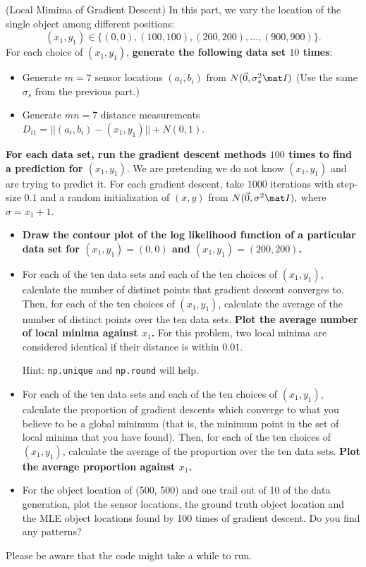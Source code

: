 \documentclass[preview]{standalone}
\begin{document}
\begin{Parts}
\Part (Local Mimima of Gradient Descent) In this part, we vary the
location of the single object among different positions: $$(x_1, y_1) \in \{(0,0),(100,100),(200,200),\dots,(900,900)\}.$$ For each choice of $(x_1,y_1)$, \textbf{generate the following data set $10$ times}:
  \begin{itemize}
    \item Generate $m=7$ sensor locations $(a_i, b_i)$ from $N(\vec 0,
      \sigma_s^2 \mat I)$ (Use the same $\sigma_s$ from the previous part.)
    \item Generate $mn=7$ distance measurements $D_{i1} = ||(a_i,b_i)-(x_1,y_1)|| + N(0, 1)$.
  \end{itemize}
 \textbf{For each data set, run the gradient descent methods $100$ times to find a prediction for $(x_1, y_1)$}. We are pretending we do not know $(x_1, y_1)$ and are trying to predict it. For each gradient descent, take $1000$ iterations with step-size $0.1$ and a random initialization of $(x,y)$ from $N(\vec 0, \sigma^2 \mat I),$ where $\sigma=x_1+1$.
\begin{itemize}
  \item \textbf{Draw the contour plot of the log likelihood function of a particular data set for $(x_1,y_1)=(0,0)$ and $(x_1,y_1)=(200,200)$.}
  \item For each of the ten data sets and each of the ten
          choices of $(x_1, y_1)$, calculate the number of
            distinct points that gradient descent converges
            to. Then, for each of the ten choices of $(x_1,y_1)$,
          calculate the average of the number of distinct points over
          the ten data sets. \textbf{Plot the average number of local
            minima against $x_1$.} For this problem, two local minima are considered identical if their distance is within $0.01$.

  Hint: \texttt{np.unique} and \texttt{np.round} will help.
  \item For each of the ten data sets and each of the ten
          choices of $(x_1, y_1)$, calculate the proportion of
          gradient descents which converge to what you believe to be a
          global minimum (that is, the minimum point in the set of
          local minima that you have found). Then, for each of the ten choices of $(x_1, y_1)$, calculate the average of the proportion over the ten data sets. \textbf{Plot the average proportion against $x_1$.}
  \item For the object location of (500, 500) and one trail out of 10 of the data generation, plot the sensor locations, the ground truth object location and the MLE object locations found by 100 times of gradient descent. Do you find any patterns?
\end{itemize}
Please be aware that the code might take a while to run.




\end{Parts}
\end{document}
